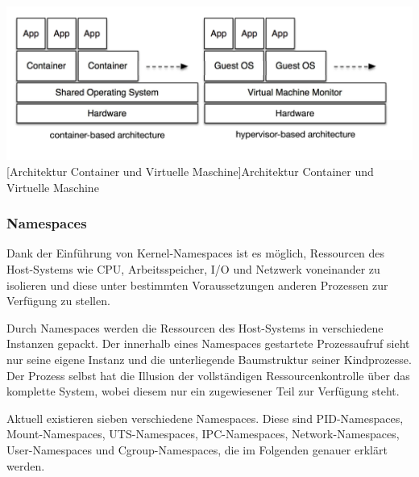 \vspace{1em}
\begin{minipage}{\linewidth}
	\centering
	\includegraphics[width=1\linewidth]{pics/docker2.png}
	[Architektur Container und Virtuelle Maschine]{Architektur Container und Virtuelle Maschine \cite{Xavier2015AClouds}}
	\label{fig:architecture}
\end{minipage}

\subsubsection{Namespaces}
Dank der Einführung von Kernel-Namespaces ist es möglich, Ressourcen des Host-Systems wie CPU, Arbeitsspeicher, I/O und Netzwerk voneinander zu isolieren und diese unter bestimmten Voraussetzungen anderen Prozessen zur Verfügung zu stellen. 

Durch Namespaces werden die Ressourcen des Host-Systems in verschiedene Instanzen gepackt. Der innerhalb eines Namespaces gestartete Prozessaufruf sieht nur seine eigene Instanz und die unterliegende Baumstruktur seiner Kindprozesse. Der Prozess selbst hat die Illusion der vollständigen Ressourcenkontrolle über das komplette System, wobei diesem nur ein zugewiesener Teil zur Verfügung steht.

Aktuell existieren sieben verschiedene Namespaces. Diese sind \ac{PID}-Namespaces, Mount-Namespaces, \ac{UTS}-Namespaces, \ac{IPC}-Namespaces, Network-Namespaces, User-Namespaces und \ac{Cgroup}-Namespaces, die im Folgenden genauer erklärt werden.



